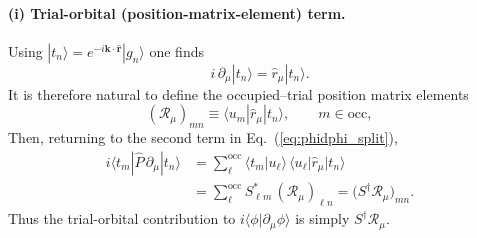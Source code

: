\documentclass[galley,aps,pra,10pt,amsmath,amssymb,
    superscriptaddress,nofootinbib,longbibliography]{revtex4-2}
\newcounter{comm}
\newcommand{\eq}[1]{Eq.~(\ref{eq:#1})}
\begin{document}
\paragraph*{(i) Trial-orbital (position-matrix-element) term.}
Using $|t_n\rangle=e^{-i\mathbf{k}\cdot\hat{\mathbf r}}|g_n\rangle$ one finds
\begin{equation}
i\,\partial_\mu |t_n\rangle = \hat r_\mu |t_n\rangle .
\end{equation}
It is therefore natural to define the occupied--trial position matrix elements
\begin{equation}
\label{eq:Rmu_def_here}
(\mathcal{R}_\mu)_{mn}
\equiv
\langle u_{m}|\hat r_\mu|t_{n}\rangle,
\qquad m\in\mathrm{occ},
\end{equation}
Then, returning to the second term in \eq{phidphi_split},
\begin{align}
i\langle t_m|\hat P\,\partial_\mu|t_n\rangle
&=
\sum_{\ell}^{\mathrm{occ}}
\langle t_m|u_\ell\rangle\,\langle u_\ell|\hat r_\mu|t_n\rangle
\nonumber\\
&=
\sum_{\ell}^{\mathrm{occ}} S^*_{\ell m}\,(\mathcal{R}_\mu)_{\ell n}
=
\big(S^\dagger \mathcal{R}_\mu\big)_{mn}.
\label{eq:trial_term_result}
\end{align}
Thus the trial-orbital contribution to $i\langle\phi|\partial_\mu\phi\rangle$ is simply $S^\dagger \mathcal{R}_\mu$.
\end{document}
